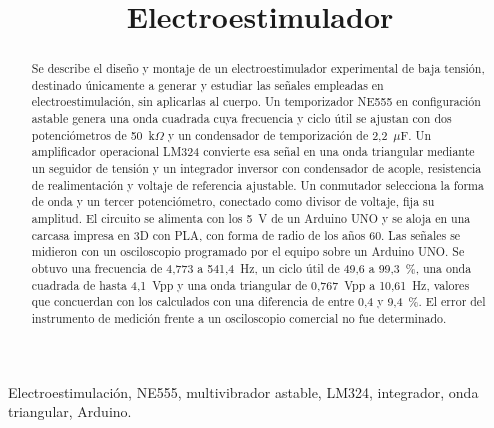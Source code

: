 \documentclass[conference]{IEEEtran}
\begin{document}
\title{Electroestimulador}

\author{
}

\maketitle

\begin{abstract}
Se describe el diseño y montaje de un electroestimulador experimental de baja tensión, destinado únicamente a generar y estudiar las señales empleadas en electroestimulación, sin aplicarlas al cuerpo. Un temporizador NE555 en configuración astable genera una onda cuadrada cuya frecuencia y ciclo útil se ajustan con dos potenciómetros de 50~k$\Omega$ y un condensador de temporización de 2,2~$\mu$F. Un amplificador operacional LM324 convierte esa señal en una onda triangular mediante un seguidor de tensión y un integrador inversor con condensador de acople, resistencia de realimentación y voltaje de referencia ajustable. Un conmutador selecciona la forma de onda y un tercer potenciómetro, conectado como divisor de voltaje, fija su amplitud. El circuito se alimenta con los 5~V de un Arduino UNO y se aloja en una carcasa impresa en 3D con PLA, con forma de radio de los años 60. Las señales se midieron con un osciloscopio programado por el equipo sobre un Arduino UNO. Se obtuvo una frecuencia de 4,773 a 541,4~Hz, un ciclo útil de 49,6 a 99,3~\%, una onda cuadrada de hasta 4,1~Vpp y una onda triangular de 0,767~Vpp a 10,61~Hz, valores que concuerdan con los calculados con una diferencia de entre 0,4 y 9,4~\%. El error del instrumento de medición frente a un osciloscopio comercial no fue determinado.
\end{abstract}

\begin{IEEEkeywords}
Electroestimulación, NE555, multivibrador astable, LM324, integrador, onda triangular, Arduino.
\end{IEEEkeywords}
\end{document}
